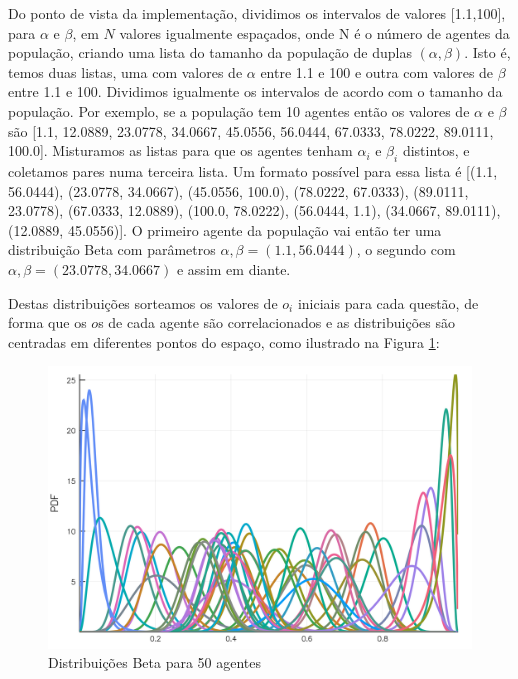 Do ponto de vista da implementação, dividimos os intervalos de valores
[1.1,100], para \(\alpha\) e \(\beta\), em \(N\) valores igualmente espaçados, onde N é o
número de agentes da população, criando uma lista do tamanho da população de
duplas \((\alpha,\beta)\). Isto é, temos duas listas, uma com valores de \(\alpha\) entre 1.1
e 100 e outra com valores de \(\beta\) entre 1.1 e 100. Dividimos igualmente os
intervalos de acordo com o tamanho da população. Por exemplo, se a população tem
10 agentes então os valores de \(\alpha\) e \(\beta\) são [1.1, 12.0889, 23.0778,
34.0667, 45.0556, 56.0444, 67.0333, 78.0222, 89.0111, 100.0]. Misturamos as
listas para que os agentes tenham \(\alpha_i\) e \(\beta_i\) distintos, e coletamos pares
numa terceira lista. Um formato possível para essa lista é [(1.1, 56.0444),
(23.0778, 34.0667), (45.0556, 100.0), (78.0222, 67.0333), (89.0111, 23.0778),
(67.0333, 12.0889), (100.0, 78.0222), (56.0444, 1.1), (34.0667, 89.0111),
(12.0889, 45.0556)]. O primeiro agente da população vai então ter uma
distribuição Beta com parâmetros \(\alpha,\beta = (1.1, 56.0444) \), o segundo com
\(\alpha,\beta=(23.0778,34.0667)\) e assim em diante.

Destas distribuições sorteamos os valores de \(o_i\) iniciais para cada questão,
de forma que os \(o\)s de cada agente são correlacionados e as distribuições são
centradas em diferentes pontos do espaço, como ilustrado na Figura
\ref{fig:betas100}:

\begin{figure}[H]
  \centering
  \includegraphics[width=\textwidth]{ims/beta100.png}
  \caption{Distribuições Beta para 50 agentes}
  \label{fig:betas100}
\end{figure}


